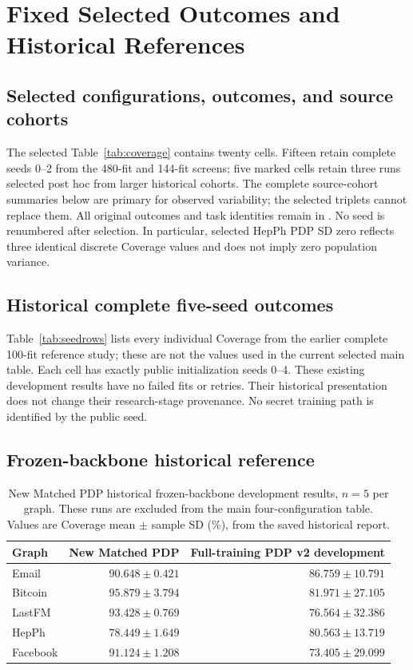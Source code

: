 \chapter{Fixed Selected Outcomes and Historical References}\label{app:development}
\section{Selected configurations, outcomes, and source cohorts}
The selected Table~\ref{tab:coverage} contains twenty cells. Fifteen retain complete seeds 0--2 from the 480-fit and 144-fit screens; five marked cells retain three runs selected post hoc from larger historical cohorts. The complete source-cohort summaries below are primary for observed variability; the selected triplets cannot replace them. All original outcomes and task identities remain in . No seed is renumbered after selection. In particular, selected HepPh PDP SD zero reflects three identical discrete Coverage values and does not imply zero population variance.

\clearpage


\clearpage


\clearpage
\section{Historical complete five-seed outcomes}
Table~\ref{tab:seedrows} lists every individual Coverage from the earlier complete 100-fit reference study; these are not the values used in the current selected main table. Each cell has exactly public initialization seeds 0--4. These existing development results have no failed fits or retries. Their historical presentation does not change their research-stage provenance. No secret training path is identified by the public seed.


\clearpage
\section{Frozen-backbone historical reference}
\begin{table}[htbp]
\centering\small
\caption{New Matched PDP historical frozen-backbone development results, $n=5$ per graph. These runs are excluded from the main four-configuration table. Values are Coverage mean $\pm$ sample SD (\%), from the saved historical report.}\label{tab:newmatched}
\begin{tabular}{lrr}\toprule
Graph & New Matched PDP & Full-training PDP v2 development\\\midrule
Email & $90.648\pm0.421$ & $86.759\pm10.791$\\
Bitcoin & $95.879\pm3.794$ & $81.971\pm27.105$\\
LastFM & $93.428\pm0.769$ & $76.564\pm32.386$\\
HepPh & $78.449\pm1.649$ & $80.563\pm13.719$\\
Facebook & $91.124\pm1.208$ & $73.405\pm29.099$\\\bottomrule
\end{tabular}
\end{table}

